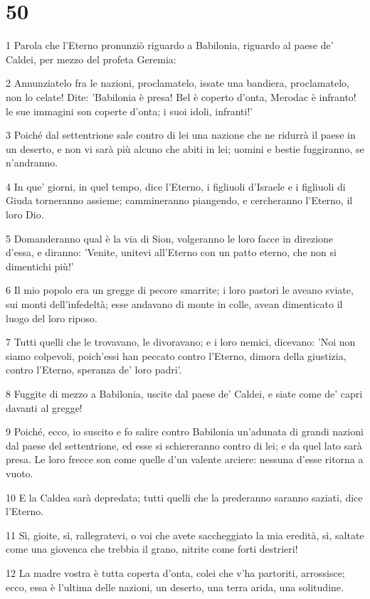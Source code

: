 \chapter{50}

\par 1 Parola che l'Eterno pronunziò riguardo a Babilonia, riguardo al paese de' Caldei, per mezzo del profeta Geremia:
\par 2 Annunziatelo fra le nazioni, proclamatelo, issate una bandiera, proclamatelo, non lo celate! Dite: 'Babilonia è presa! Bel è coperto d'onta, Merodac è infranto! le sue immagini son coperte d'onta; i suoi idoli, infranti!'
\par 3 Poiché dal settentrione sale contro di lei una nazione che ne ridurrà il paese in un deserto, e non vi sarà più alcuno che abiti in lei; uomini e bestie fuggiranno, se n'andranno.
\par 4 In que' giorni, in quel tempo, dice l'Eterno, i figliuoli d'Israele e i figliuoli di Giuda torneranno assieme; cammineranno piangendo, e cercheranno l'Eterno, il loro Dio.
\par 5 Domanderanno qual è la via di Sion, volgeranno le loro facce in direzione d'essa, e diranno: 'Venite, unitevi all'Eterno con un patto eterno, che non si dimentichi più!'
\par 6 Il mio popolo era un gregge di pecore smarrite; i loro pastori le aveano sviate, sui monti dell'infedeltà; esse andavano di monte in colle, avean dimenticato il luogo del loro riposo.
\par 7 Tutti quelli che le trovavano, le divoravano; e i loro nemici, dicevano: 'Noi non siamo colpevoli, poich'essi han peccato contro l'Eterno, dimora della giustizia, contro l'Eterno, speranza de' loro padri'.
\par 8 Fuggite di mezzo a Babilonia, uscite dal paese de' Caldei, e siate come de' capri davanti al gregge!
\par 9 Poiché, ecco, io suscito e fo salire contro Babilonia un'adunata di grandi nazioni dal paese del settentrione, ed esse si schiereranno contro di lei; e da quel lato sarà presa. Le loro frecce son come quelle d'un valente arciere: nessuna d'esse ritorna a vuoto.
\par 10 E la Caldea sarà depredata; tutti quelli che la prederanno saranno saziati, dice l'Eterno.
\par 11 Sì, gioite, sì, rallegratevi, o voi che avete saccheggiato la mia eredità, sì, saltate come una giovenca che trebbia il grano, nitrite come forti destrieri!
\par 12 La madre vostra è tutta coperta d'onta, colei che v'ha partoriti, arrossisce; ecco, essa è l'ultima delle nazioni, un deserto, una terra arida, una solitudine.
